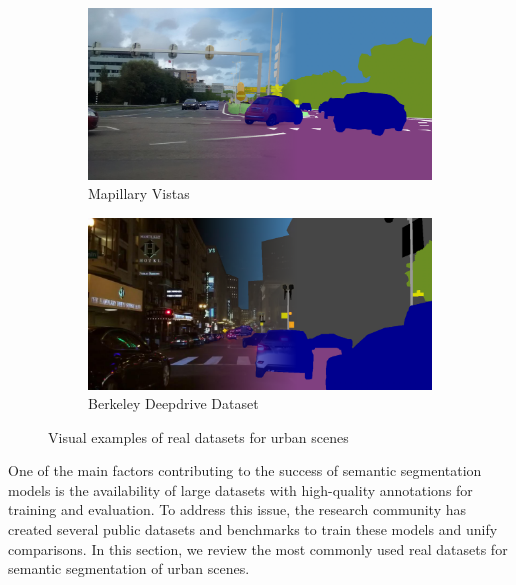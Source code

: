 \begin{figure}
  \begin{subfigure}{0.49\columnwidth}
    \includegraphics[width=\columnwidth]{img/2-related-work/mapilliary_semantic_segmentation_overlay.png}
    \caption{Mapillary Vistas \cite{mapilliary}}
    \label{fig:example-dbb100k}
  \end{subfigure}
  \begin{subfigure}[b]{0.49\columnwidth}
    \includegraphics[width=\columnwidth]{img/2-related-work/dbb100k_semantic_segmentation_overlay.png}
    \caption{Berkeley Deepdrive Dataset \cite{BDD100K}}
    \label{fig:example-mapilliary}
  \end{subfigure}

  \caption[Visual examples of real datasets for urban scenes]{Visual examples of real datasets for urban scenes}
    \label{fig:real-datasets-examples}

\end{figure}

One of the main factors contributing to the success of semantic segmentation models is the availability of large datasets with high-quality annotations for training and evaluation. To address this issue, the research community has created several public datasets and benchmarks to train these models and unify comparisons. In this section, we review the most commonly used real datasets for semantic segmentation of urban scenes. 

